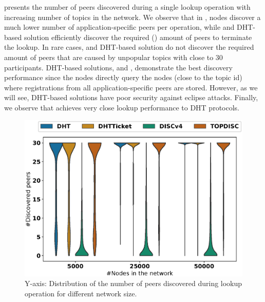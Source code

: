  presents the number of peers discovered during a single lookup operation with increasing number of topics in the network. We observe that in \discv, nodes discover a much lower number of application-specific peers per operation, while \sysname and DHT-based solution efficiently discover the required () amount of peers to terminate the lookup. In rare cases, \sysname and DHT-based solution do not discover the required amount of peers that are caused by unpopular topics with close to 30 participants. 
DHT-based solutions, \altname and \altnameticket, demonstrate the best discovery performance since the nodes directly query the nodes (close to the topic id) where registrations from all application-specific peers are stored. However, as we will see, DHT-based solutions have poor security against eclipse attacks. 
Finally, we observe that \sysname achieves very close lookup performance to DHT protocols. 


\begin{figure}[!h]
\includegraphics[width=\linewidth]{results/no_split/violin_size_discovered.eps}
\caption{Y-axis: Distribution of the number of peers discovered during lookup operation for different network size.}
\label{fig:discoveredPerSize}
\end{figure}

